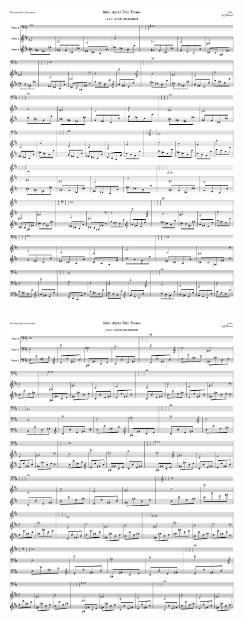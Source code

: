 \begin{figure}[H]                                             
{                                                             
  \setlength{\tabcolsep}{3.0pt}                               
  \setlength\cmidrulewidth{\heavyrulewidth} %
    \begin{subfigure}{0.5\textwidth}                            
  \includegraphics[width=6cm]{music/title_no_49_page_1001.png}%
    \end{subfigure}                                             
  \begin{subfigure}{0.5\textwidth}                            
  \includegraphics[width=6cm]{music/title_no_50_page_1001.png}%
    \end{subfigure}                                             
}                                                             
\end{figure}                                                  


